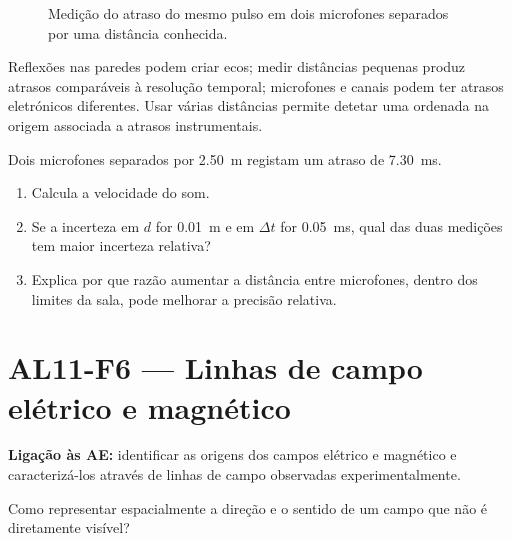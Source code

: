 \documentclass[11pt,a4paper,openany]{book}
\newcounter{exercicio}[chapter]
\renewcommand{\theexercicio}{\thechapter.\arabic{exercicio}}
\newenvironment{exercicio}[1][]%
{\refstepcounter{exercicio}%
\begin{tcolorbox}[breakable,colback=white,colframe=eublue!70,
 title={Exercício \theexercicio\if\relax\detokenize{#1}\relax\else\ --- #1\fi},fonttitle=\bfseries]}%
{\end{tcolorbox}}
\newcommand{\LigAE}[1]{\textbf{Ligação às AE:} #1}
\begin{document}
\begin{figure}[H]
\centering
{}
\caption{Medição do atraso do mesmo pulso em dois microfones separados por uma distância conhecida.}
\end{figure}

\begin{erros}
Reflexões nas paredes podem criar ecos; medir distâncias pequenas produz atrasos comparáveis à resolução temporal; microfones e canais podem ter atrasos eletrónicos diferentes. Usar várias distâncias permite detetar uma ordenada na origem associada a atrasos instrumentais.
\end{erros}

\begin{exercicio}[Velocidade do som]
Dois microfones separados por \SI{2.50}{m} registam um atraso de \SI{7.30}{ms}.
\begin{enumerate}[label=\alph*)]
\item Calcula a velocidade do som.
\item Se a incerteza em $d$ for \SI{0.01}{m} e em $\Delta t$ for \SI{0.05}{ms}, qual das duas medições tem maior incerteza relativa?
\item Explica por que razão aumentar a distância entre microfones, dentro dos limites da sala, pode melhorar a precisão relativa.
\end{enumerate}
\end{exercicio}

\section{AL11-F6 — Linhas de campo elétrico e magnético}
\LigAE{identificar as origens dos campos elétrico e magnético e caracterizá-los através de linhas de campo observadas experimentalmente.}

\begin{questao}
Como representar espacialmente a direção e o sentido de um campo que não é diretamente visível?
\end{questao}
\end{document}
